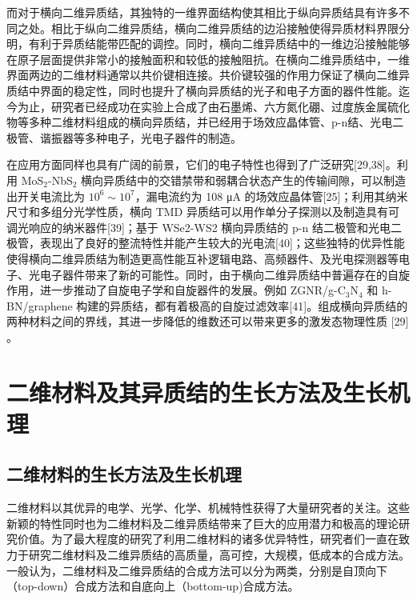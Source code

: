     而对于横向二维异质结，其独特的一维界面结构使其相比于纵向异质结具有许多不同之处。相比于纵向二维异质结，横向二维异质结的边沿接触使得异质材料界限分明，有利于异质结能带匹配的调控。同时，横向二维异质结中的一维边沿接触能够在原子层面提供非常小的接触面积和较低的接触阻抗。在横向二维异质结中，一维界面两边的二维材料通常以共价键相连接。共价键较强的作用力保证了横向二维异质结中界面的稳定性，同时也提升了横向异质结的光子和电子方面的器件性能。迄今为止，研究者已经成功在实验上合成了由石墨烯、六方氮化硼、过度族金属硫化物等多种二维材料组成的横向异质结，并已经用于场效应晶体管、p-n结、光电二极管、谐振器等多种电子，光电子器件的制造。

    在应用方面同样也具有广阔的前景，它们的电子特性也得到了广泛研究[29,38]。利用 MoS$_2$-NbS$_2$ 横向异质结中的交错禁带和弱耦合状态产生的传输间隙，可以制造出开关电流比为 $10^6 \sim 10^7$，漏电流约为 108 \si{\micro\ampere} 的场效应晶体管[25]；利用其纳米尺寸和多组分光学性质，横向 TMD 异质结可以用作单分子探测以及制造具有可调光响应的纳米器件[39]；基于 WSe2-WS2 横向异质结的 p-n 结二极管和光电二极管，表现出了良好的整流特性并能产生较大的光电流[40]；这些独特的优异性能使得横向二维异质结为制造更高性能互补逻辑电路、高频器件、及光电探测器等电子、光电子器件带来了新的可能性。同时，由于横向二维异质结中普遍存在的自旋作用，进一步推动了自旋电子学和自旋器件的发展。例如 ZGNR/g-C$_3$N$_4$ 和 h-BN/graphene 构建的异质结，都有着极高的自旋过滤效率[41]。组成横向异质结的两种材料之间的界线，其进一步降低的维数还可以带来更多的激发态物理性质 [29] 。

\section{二维材料及其异质结的生长方法及生长机理}
\subsection{二维材料的生长方法及生长机理}
    二维材料以其优异的电学、光学、化学、机械特性获得了大量研究者的关注。这些新颖的特性同时也为二维材料及二维异质结带来了巨大的应用潜力和极高的理论研究价值。为了最大程度的研究了利用二维材料的诸多优异特性，研究者们一直在致力于研究二维材料及二维异质结的高质量，高可控，大规模，低成本的合成方法。一般认为，二维材料及二维异质结的合成方法可以分为两类，分别是自顶向下（top-down）合成方法和自底向上（bottom-up)合成方法。%

